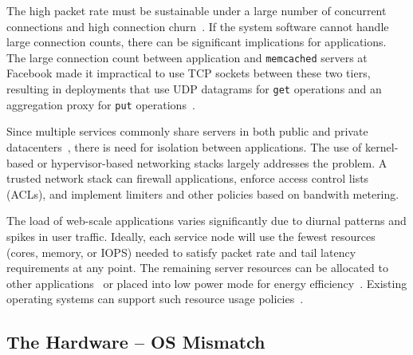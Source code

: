 The high packet rate must be sustainable under a large number of
concurrent connections and high connection
churn~\cite{theC10Mproblem}. If the system software cannot handle
large connection counts, there can be significant implications for
applications.  The large connection count between
application and \texttt{memcached} servers at Facebook made it
impractical to use TCP sockets between these two tiers, resulting in
deployments that use UDP datagrams for \texttt{get} operations and an
aggregation proxy for \texttt{put}
operations~\cite{DBLP:conf/nsdi/NishtalaFGKLLMPPSSTV13}.

 Since multiple services commonly share
servers in both public and private
datacenters~\cite{DBLP:journals/cacm/DeanB13,Hindman:2011:MPF,Schwarzkopf:2013:OFS},
there is need for isolation between applications. The use of
kernel-based or hypervisor-based networking stacks largely addresses
the problem. A trusted network stack can firewall applications,
enforce access control lists (ACLs), and implement limiters and other
policies based on bandwith metering.

 The load of web-scale applications
varies significantly due to diurnal patterns and spikes in user
traffic. Ideally, each service node will use the fewest resources
(cores, memory, or IOPS) needed to satisfy packet rate and tail
latency requirements at any point. The remaining server resources can
be allocated to other
applications~\cite{DBLP:conf/asplos/DelimitrouK14,Hindman:2011:MPF} or
placed into low power mode for energy
efficiency~\cite{DBLP:journals/computer/BarrosoH07}. Existing
operating systems can support such resource usage
policies~\cite{DBLP:conf/eurosys/LeverichK14,DBLP:conf/isca/LoCGBK14}.

\subsection{The Hardware -- OS Mismatch}
\label{sec:motivation:web}

